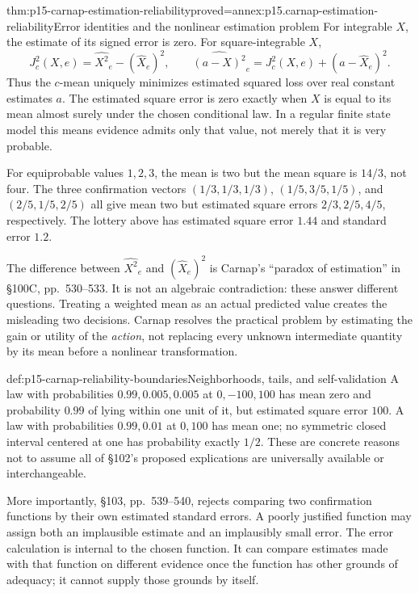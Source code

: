 \begin{hbtheorem}{thm:p15-carnap-estimation-reliability}{proved=annex:p15.carnap-estimation-reliability}{Error identities and the nonlinear estimation problem}
For integrable \(X\), the estimate of its signed error is zero.
For square-integrable \(X\),
\[
 J_c^2(X,e)=\widehat{X^2}_e-(\widehat X_e)^2,
 \qquad
 \widehat{(a-X)^2}_e=J_c^2(X,e)+(a-\widehat X_e)^2.
\]
Thus the \(c\)-mean uniquely minimizes estimated squared loss over
real constant estimates \(a\). The estimated square error is zero
exactly when \(X\) is equal to its mean almost surely under the
chosen conditional law. In a regular finite state model this means
evidence admits only that value, not merely that it is very probable.

For equiprobable values \(1,2,3\), the mean is two but the mean
square is \(14/3\), not four. The three confirmation vectors
\((1/3,1/3,1/3)\), \((1/5,3/5,1/5)\), and
\((2/5,1/5,2/5)\) all give mean two but estimated square errors
\(2/3,2/5,4/5\), respectively. The lottery above has estimated
square error \(1.44\) and standard error \(1.2\).
\end{hbtheorem}

The difference between \(\widehat{X^2}_e\) and
\((\widehat X_e)^2\) is Carnap's ``paradox of estimation'' in
§100C, pp.~530--533. It is not an algebraic contradiction: these
answer different questions. Treating a weighted mean as an actual
predicted value creates the misleading two decisions. Carnap resolves
the practical problem by estimating the gain or utility of the
\emph{action}, not replacing every unknown intermediate quantity by
its mean before a nonlinear transformation.

\begin{hbwarning}{def:p15-carnap-reliability-boundaries}{Neighborhoods, tails, and self-validation}
A law with probabilities \(0.99,0.005,0.005\) at \(0,-100,100\)
has mean zero and probability \(0.99\) of lying within one unit
of it, but estimated square error \(100\). A law with probabilities
\(0.99,0.01\) at \(0,100\) has mean one; no symmetric closed
interval centered at one has probability exactly \(1/2\).
These are concrete reasons not to assume all of §102's proposed
explications are universally available or interchangeable.

More importantly, §103, pp.~539--540, rejects comparing two
confirmation functions by their own estimated standard errors.
A poorly justified function may assign both an implausible estimate and
an implausibly small error. The error calculation is internal to the
chosen function. It can compare estimates made with that function on
different evidence once the function has other grounds of adequacy;
it cannot supply those grounds by itself.
\end{hbwarning}

